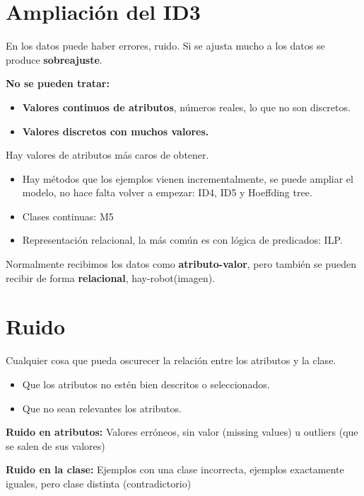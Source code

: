 \documentclass[12pt, twoside, openright]{report} %
\begin{document}
\section{Ampliación del ID3}

En los datos puede haber errores, ruido. Si se ajusta mucho a los datos
se produce \textbf{sobreajuste}.

\textbf{No se pueden tratar:}

\begin{itemize}

\item
  \textbf{Valores continuos de atributos}, números reales, lo que no son
  discretos.
\item
  \textbf{Valores discretos con muchos valores.}
\end{itemize}

Hay valores de atributos más caros de obtener.

\begin{itemize}
\item
  Hay métodos que los ejemplos vienen incrementalmente, se puede ampliar el modelo, no hace falta volver a empezar: ID4, ID5 y Hoeffding tree.
\item
  Clases continuas: M5
\item
  Representación relacional, la más común es con lógica de predicados:
  ILP.
\end{itemize}

Normalmente recibimos los datos como \textbf{atributo-valor}, pero 
también se pueden recibir de forma \textbf{relacional}, hay-robot(imagen).

\section{Ruido}

Cualquier cosa que pueda oscurecer la relación entre los atributos y la
clase.

\begin{itemize}

\item
  Que los atributos no estén bien descritos o seleccionados.
\item
  Que no sean relevantes los atributos.
\end{itemize}

\textbf{Ruido en atributos:} Valores erróneos, sin valor (missing values) u outliers (que se salen de sus valores)

\textbf{Ruido en la clase:} Ejemplos con una clase incorrecta, ejemplos
exactamente iguales, pero clase distinta (contradictorio)
\end{document}
